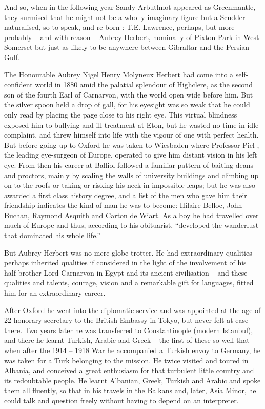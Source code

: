 And so, when in the following year Sandy Arbuthnot appeared as Greenmantle, they surmised that he might not be a wholly imaginary figure but a Scudder naturalised, so to speak, and re-born : T.E. Lawrence, perhaps, but more probably – and with reason – Aubrey Herbert, nominally of Pixton Park in West Somerset but just as likely to be anywhere between Gibraltar and the Persian Gulf.
 
The Honourable Aubrey Nigel Henry Molyneux Herbert had come into a self-confident world in 1880 amid the palatial splendour of Highclere, as the second son of the fourth Earl of Carnarvon, with the world open wide before him. But the silver spoon held a drop of gall, for his eyesight was so weak that he could only read by placing the page close to his right eye. This virtual blindness exposed him to bullying and ill-treatment at Eton, but he wasted no time in idle complaint, and threw himself into life with the vigour of one with perfect health. But before going up to Oxford he was taken to Wiesbaden where Professor Piel , the leading eye-surgeon of Europe, operated to give him distant vision in his left eye. From then his career at Balliol followed a familiar pattern of baiting deans and proctors, mainly by scaling the walls of university buildings and climbing up on to the roofs or taking or risking his neck in impossible leaps; but he was also awarded a first class history degree, and a list of the men who gave him their friendship indicates the kind of man he was to become: Hilaire Belloc, John Buchan, Raymond Asquith and Carton de Wiart. As a boy he had travelled over much of Europe and thus, according to his obituarist, “developed the wanderlust that dominated his whole life.”

But Aubrey Herbert was no mere globe-trotter. He had extraordinary qualities – perhaps inherited qualities if considered in the light of the involvement of his half-brother Lord Carnarvon in Egypt and its ancient civilisation – and these qualities and talents, courage, vision and a remarkable gift for languages, fitted him for an extraordinary career. 

After Oxford he went into the diplomatic service and was appointed at the age of 22 honorary secretary to the British Embassy in Tokyo, but never felt at ease there. Two years later he was transferred to Constantinople (modern Istanbul), and there he learnt Turkish, Arabic and Greek – the first of these so well that when after the 1914 – 1918 War he accompanied a Turkish envoy to Germany, he was taken for a Turk belonging to the mission. He twice visited and toured in Albania, and conceived a great enthusiasm for that turbulent little country and its redoubtable people. He learnt Albanian, Greek, Turkish and Arabic and spoke them all fluently, so that in his travels in the Balkans and, later, Asia Minor, he could talk and question freely without having to depend on an interpreter. 

